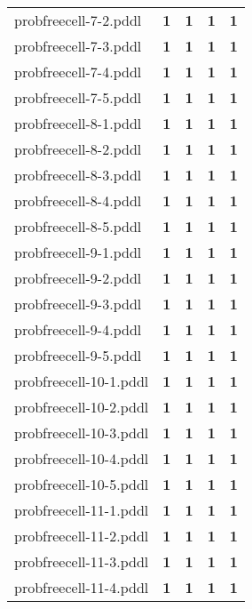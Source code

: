 \documentclass{article}
\begin{document}
\begin{tabular}{@{}lrrrr@{}}
probfreecell-7-2.pddl & \textbf{1} & \textbf{1} & \textbf{1} & \textbf{1} \\
probfreecell-7-3.pddl & \textbf{1} & \textbf{1} & \textbf{1} & \textbf{1} \\
probfreecell-7-4.pddl & \textbf{1} & \textbf{1} & \textbf{1} & \textbf{1} \\
probfreecell-7-5.pddl & \textbf{1} & \textbf{1} & \textbf{1} & \textbf{1} \\
probfreecell-8-1.pddl & \textbf{1} & \textbf{1} & \textbf{1} & \textbf{1} \\
probfreecell-8-2.pddl & \textbf{1} & \textbf{1} & \textbf{1} & \textbf{1} \\
probfreecell-8-3.pddl & \textbf{1} & \textbf{1} & \textbf{1} & \textbf{1} \\
probfreecell-8-4.pddl & \textbf{1} & \textbf{1} & \textbf{1} & \textbf{1} \\
probfreecell-8-5.pddl & \textbf{1} & \textbf{1} & \textbf{1} & \textbf{1} \\
probfreecell-9-1.pddl & \textbf{1} & \textbf{1} & \textbf{1} & \textbf{1} \\
probfreecell-9-2.pddl & \textbf{1} & \textbf{1} & \textbf{1} & \textbf{1} \\
probfreecell-9-3.pddl & \textbf{1} & \textbf{1} & \textbf{1} & \textbf{1} \\
probfreecell-9-4.pddl & \textbf{1} & \textbf{1} & \textbf{1} & \textbf{1} \\
probfreecell-9-5.pddl & \textbf{1} & \textbf{1} & \textbf{1} & \textbf{1} \\
probfreecell-10-1.pddl & \textbf{1} & \textbf{1} & \textbf{1} & \textbf{1} \\
probfreecell-10-2.pddl & \textbf{1} & \textbf{1} & \textbf{1} & \textbf{1} \\
probfreecell-10-3.pddl & \textbf{1} & \textbf{1} & \textbf{1} & \textbf{1} \\
probfreecell-10-4.pddl & \textbf{1} & \textbf{1} & \textbf{1} & \textbf{1} \\
probfreecell-10-5.pddl & \textbf{1} & \textbf{1} & \textbf{1} & \textbf{1} \\
probfreecell-11-1.pddl & \textbf{1} & \textbf{1} & \textbf{1} & \textbf{1} \\
probfreecell-11-2.pddl & \textbf{1} & \textbf{1} & \textbf{1} & \textbf{1} \\
probfreecell-11-3.pddl & \textbf{1} & \textbf{1} & \textbf{1} & \textbf{1} \\
probfreecell-11-4.pddl & \textbf{1} & \textbf{1} & \textbf{1} & \textbf{1} \\

\end{tabular}
\end{document}

